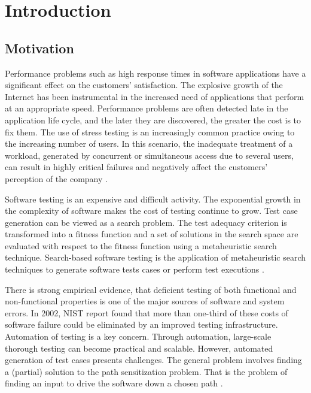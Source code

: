 \documentclass[espaco=umemeio,chapter=TITLE,twoside,openright]{abnt}
\begin{document}




%



\chapter{Introduction}

\section{Motivation}

Performance problems such as high response times in software applications have a significant effect on the customers’  satisfaction. The explosive growth of the Internet has been instrumental in the increased need of applications that perform at an appropriate speed. Performance problems are often detected late in the application life cycle, and the later they are discovered, the greater the cost is to fix them. The use of stress testing is an increasingly common practice owing to the increasing number of users. In this scenario, the inadequate treatment of a workload,  generated by concurrent or simultaneous access due to several users, can result in highly critical failures and negatively affect the customers' perception of the company  \cite{Jiang2010} \cite{Molyneaux2009} \cite{Wert2014}.

Software testing is an expensive and difficult activity. The exponential
growth in the complexity of software makes the cost of testing continue to grow. Test case generation can be viewed as a search problem. The test adequacy criterion is transformed into a fitness function and a set of solutions in the search
space are evaluated with respect to the fitness function using a metaheuristic search technique. Search-based software testing is the application of metaheuristic search techniques to generate software
tests cases or perform test executions \cite{Afzal2009a}.

There is strong empirical evidence, that deficient
testing of both functional and non-functional properties
is one of the major sources of software and system errors. In 2002, NIST  report found that more than one-third of these costs of software failure could be eliminated by an improved testing infrastructure.
Automation of testing is a key concern. Through
automation, large-scale thorough testing can become
practical and scalable. However, automated generation of test cases presents challenges. The general problem involves finding a (partial) solution to the path sensitization problem. That is the problem of finding an input to drive the software down a chosen path \cite{Harman2010} \cite{dean2003managing}.
\end{document}
